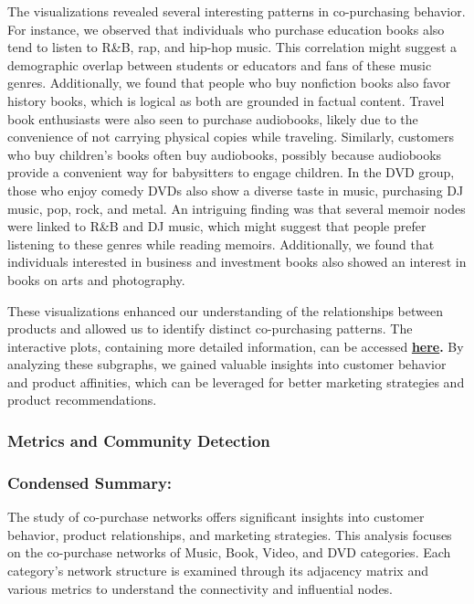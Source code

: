 \documentclass[
]{article}
\begin{document}
The visualizations revealed several interesting patterns in
co-purchasing behavior. For instance, we observed that individuals who
purchase education books also tend to listen to R\&B, rap, and hip-hop
music. This correlation might suggest a demographic overlap between
students or educators and fans of these music genres. Additionally, we
found that people who buy nonfiction books also favor history books,
which is logical as both are grounded in factual content. Travel book
enthusiasts were also seen to purchase audiobooks, likely due to the
convenience of not carrying physical copies while traveling. Similarly,
customers who buy children's books often buy audiobooks, possibly
because audiobooks provide a convenient way for babysitters to engage
children. In the DVD group, those who enjoy comedy DVDs also show a
diverse taste in music, purchasing DJ music, pop, rock, and metal. An
intriguing finding was that several memoir nodes were linked to R\&B and
DJ music, which might suggest that people prefer listening to these
genres while reading memoirs. Additionally, we found that individuals
interested in business and investment books also showed an interest in
books on arts and photography.

These visualizations enhanced our understanding of the relationships
between products and allowed us to identify distinct co-purchasing
patterns. The interactive plots, containing more detailed information,
can be accessed
\href{https://amazon-product-sna-visualization.netlify.app/}{\textbf{here}}\textbf{.}
By analyzing these subgraphs, we gained valuable insights into customer
behavior and product affinities, which can be leveraged for better
marketing strategies and product recommendations.

\subsubsection{Metrics and Community
Detection}\label{metrics-and-community-detection}

\subsubsection{Condensed Summary:}\label{condensed-summary}

The study of co-purchase networks offers significant insights into
customer behavior, product relationships, and marketing strategies. This
analysis focuses on the co-purchase networks of Music, Book, Video, and
DVD categories. Each category's network structure is examined through
its adjacency matrix and various metrics to understand the connectivity
and influential nodes.
\end{document}
